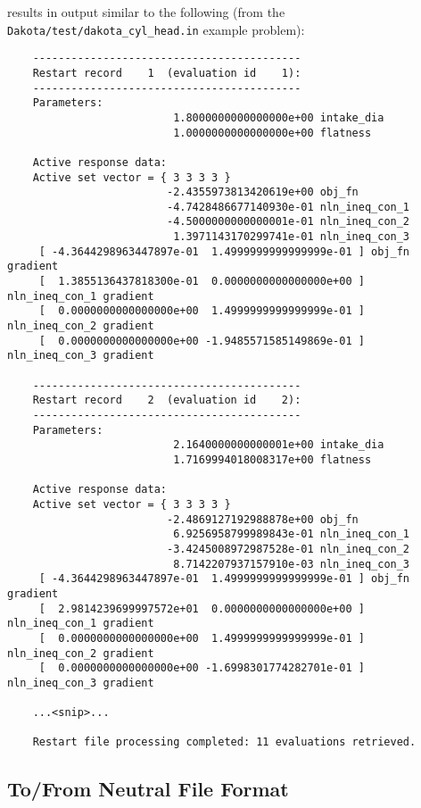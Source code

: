 results in output similar to the following (from the
\texttt{Dakota/test/dakota\_cyl\_head.in} example problem):
\begin{small}
\begin{verbatim}
    ------------------------------------------
    Restart record    1  (evaluation id    1):
    ------------------------------------------
    Parameters:
                          1.8000000000000000e+00 intake_dia
                          1.0000000000000000e+00 flatness

    Active response data:
    Active set vector = { 3 3 3 3 }
                         -2.4355973813420619e+00 obj_fn
                         -4.7428486677140930e-01 nln_ineq_con_1
                         -4.5000000000000001e-01 nln_ineq_con_2
                          1.3971143170299741e-01 nln_ineq_con_3
     [ -4.3644298963447897e-01  1.4999999999999999e-01 ] obj_fn gradient
     [  1.3855136437818300e-01  0.0000000000000000e+00 ] nln_ineq_con_1 gradient
     [  0.0000000000000000e+00  1.4999999999999999e-01 ] nln_ineq_con_2 gradient
     [  0.0000000000000000e+00 -1.9485571585149869e-01 ] nln_ineq_con_3 gradient

    ------------------------------------------
    Restart record    2  (evaluation id    2):
    ------------------------------------------
    Parameters:
                          2.1640000000000001e+00 intake_dia
                          1.7169994018008317e+00 flatness

    Active response data:
    Active set vector = { 3 3 3 3 }
                         -2.4869127192988878e+00 obj_fn
                          6.9256958799989843e-01 nln_ineq_con_1
                         -3.4245008972987528e-01 nln_ineq_con_2
                          8.7142207937157910e-03 nln_ineq_con_3
     [ -4.3644298963447897e-01  1.4999999999999999e-01 ] obj_fn gradient
     [  2.9814239699997572e+01  0.0000000000000000e+00 ] nln_ineq_con_1 gradient
     [  0.0000000000000000e+00  1.4999999999999999e-01 ] nln_ineq_con_2 gradient
     [  0.0000000000000000e+00 -1.6998301774282701e-01 ] nln_ineq_con_3 gradient

    ...<snip>...

    Restart file processing completed: 11 evaluations retrieved.
\end{verbatim}
\end{small}

\subsection{To/From Neutral File Format}\label{restart:utility:neutral}

